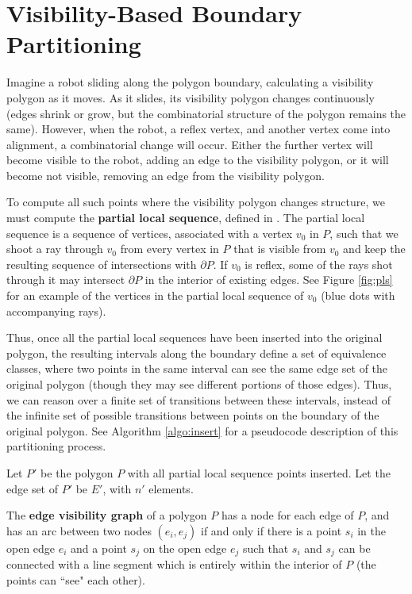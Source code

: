 \documentclass[]{svproc}  %
\begin{document}
\section{Visibility-Based Boundary Partitioning} \label{sec:partition}

Imagine a robot sliding along the polygon boundary, calculating a visibility
polygon as it moves. As it slides, its visibility polygon changes continuously
(edges shrink or grow, but the combinatorial structure of the polygon remains
the same). However, when the robot, a reflex vertex, and another vertex come
into alignment, a combinatorial change will occur. Either the further vertex
will become visible to the robot, adding an edge to the visibility polygon, or
it will become not visible, removing an edge from the visibility polygon.

To compute all such points where the visibility polygon changes structure, we
must compute the \textbf{partial local sequence}, defined in \cite{rourke_viz}.
The partial local sequence is a sequence of vertices, associated with a vertex
$v_0$ in $P$, such that we shoot a ray through $v_0$ from every vertex in $P$
that is visible from $v_0$ and keep the resulting sequence of intersections with
$\partial P$. If $v_0$ is reflex, some of the rays shot through it may intersect
$\partial P$ in the interior of existing edges. See Figure \ref{fig:pls} for an
example of the vertices in the partial local sequence of $v_0$ (blue dots with
accompanying rays).

Thus, once all the partial local sequences have been inserted into the original
polygon, the resulting intervals along the boundary define a set of equivalence
classes, where two points in the same interval can see the same edge set of the
original polygon (though they may see different portions of those edges). Thus,
we can reason over a finite set of transitions between these intervals, instead
of the infinite set of possible transitions between points on the boundary of
the original polygon. See Algorithm \ref{algo:insert} for a pseudocode
description of this partitioning process.

Let $P'$ be the polygon $P$ with all partial local sequence points inserted.
Let the edge set of $P'$ be $E'$, with $n'$ elements.

\begin{definition}
The \textbf{edge visibility graph} of a polygon $P$ has a node for each edge of
$P$, and has an arc between two nodes $(e_i, e_j)$ if and only if there is a
point $s_i$ in the open edge $e_i$ and a point $s_j$ on the open edge $e_j$ such
that $s_i$ and $s_j$ can be connected with a line segment which is entirely
within the interior of $P$ (the points can ``see" each other).
\end{definition}
\end{document}
